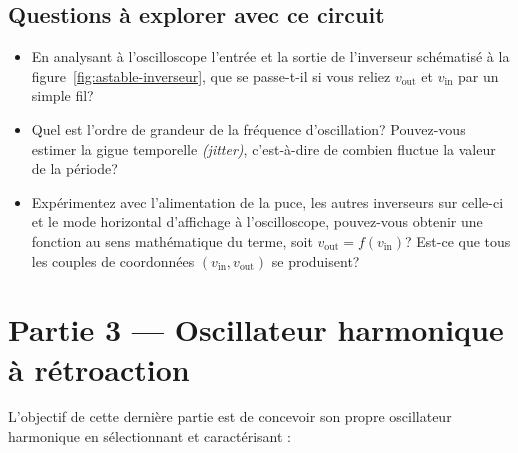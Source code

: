 \documentclass[canadien,12pt,oneside,letterpaper]{article}
\begin{document}
\subsection{Questions à explorer avec ce circuit}
\begin{itemize}
    \item En analysant à l'oscilloscope l'entrée et la sortie de l'inverseur schématisé à la figure~\ref{fig:astable-inverseur}, que se passe-t-il si vous reliez $v_{\text{out}}$ et $v_{\text{in}}$ par un simple fil?
    \item Quel est l'ordre de grandeur de la fréquence d'oscillation? Pouvez-vous estimer la gigue temporelle \textit{(jitter)}, c'est-à-dire de combien fluctue la valeur de la période?
    \item Expérimentez avec l'alimentation de la puce, les autres inverseurs sur celle-ci et le mode horizontal d'affichage à l'oscilloscope, pouvez-vous obtenir une fonction au sens mathématique du terme, soit $v_{\text{out}} = f\left(v_{\text{in}}\right)$? Est-ce que tous les couples de coordonnées $(v_{\text{in}},v_{\text{out}})$ se produisent? %
\end{itemize}

\section{Partie 3 --- Oscillateur harmonique à rétroaction}
L'objectif de cette dernière partie est de concevoir son propre oscillateur harmonique en sélectionnant et caractérisant :
\end{document}
